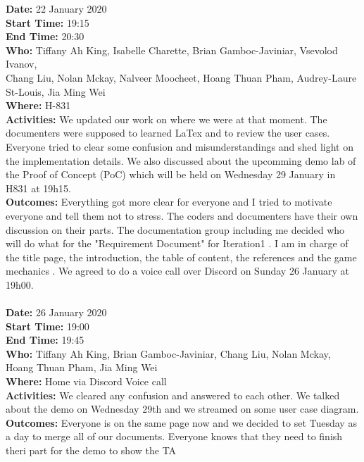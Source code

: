 \documentclass[12pt]{article}
\begin{document}
{\bf Date:} 22 January 2020\\
{\bf Start Time:} 19:15\\
{\bf End Time:} 20:30\\
{\bf Who:} Tiffany Ah King, Isabelle Charette, Brian Gamboc-Javiniar, Vsevolod Ivanov,\\
Chang Liu, Nolan Mckay, Nalveer Moocheet, Hoang Thuan Pham, Audrey-Laure St-Louis, Jia Ming Wei\\
{\bf Where:} H-831\\
{\bf Activities:} We updated our work on where we were at that moment. The documenters were supposed to learned LaTex and to review  the user cases. Everyone tried to clear some confusion and misunderstandings and shed light on the implementation details. We also discussed about the upcomming demo lab of the Proof of Concept (PoC) which will be held on Wednesday 29 January in H831 at 19h15.\\
{\bf Outcomes:} Everything got more clear for everyone and I tried to motivate everyone and tell them not to stress. The coders and documenters have their own discussion on their parts. The documentation group including me decided who will do what for the "Requirement Document" for Iteration1 . I am in charge of the title page, the introduction, the table of content, the references and the game mechanics . We agreed to do a voice call over Discord on Sunday 26 January at 19h00.\\ \\ 


{\bf Date:} 26 January 2020\\
{\bf Start Time:} 19:00\\
{\bf End Time:} 19:45\\
{\bf Who:} Tiffany Ah King, Brian Gamboc-Javiniar,
Chang Liu, Nolan Mckay, Hoang Thuan Pham, Jia Ming Wei\\
{\bf Where:} Home via Discord Voice call\\
{\bf Activities:} We cleared any confusion and answered to each other. We talked about the demo on Wednesday 29th and we streamed on some user case diagram.\\
{\bf Outcomes:} Everyone is on the same page now and we decided to set Tuesday as a day to merge all of our documents. Everyone knows that they need to finish theri part for the demo to show the TA\\



\end{document}
